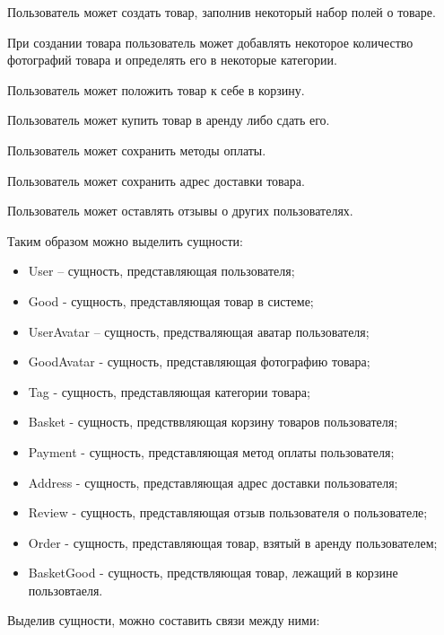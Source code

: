 Пользователь может создать товар, заполнив некоторый набор полей о товаре.

При создании товара пользователь может добавлять некоторое количество фотографий товара и определять его в некоторые категории.

Пользователь может положить товар к себе в корзину.

Пользователь может купить товар в аренду либо сдать его.

Пользователь может сохранить методы оплаты.

Пользователь может сохранить адрес доставки товара.

Пользователь может оставлять отзывы о других пользователях.

Таким образом можно выделить сущности:
\begin{itemize}
    \item User – сущность, представляющая пользователя;
    \item Good - сущность, представляющая товар в системе;
    \item UserAvatar – сущность, предстваляющая аватар пользователя;
    \item GoodAvatar - сущность, представляющая фотографию товара;
    \item Tag - сущность, представляющая категории товара;
    \item Basket - сущность, предстввляющая корзину товаров пользователя;
    \item Payment - сущность, представляющая метод оплаты пользователя;
    \item Address - сущность, представляющая адрес доставки пользователя;
    \item Review - сущность, представляющая отзыв пользователя о пользователе;
    \item Order - сущность, представляющая товар, взятый в аренду пользователем;
    \item BasketGood - сущность, предствляющая товар, лежащий в корзине пользовтаеля.
\end{itemize}

Выделив сущности, можно составить связи между ними:
\bigbreak

